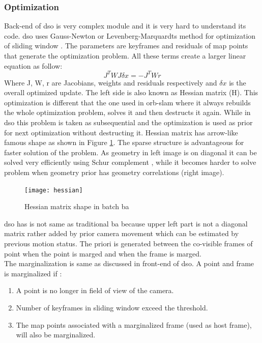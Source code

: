 \subsubsection{Optimization}
Back-end of \acrshort{dso} is very complex module and it is very hard to understand its code. \acrshort{dso} uses Gauss-Newton or Levenberg-Marquardts method for optimization of sliding window \cite{Engel-et-al-pami2018}. The parameters are keyframes and residuals of map points that generate the optimization problem. All these terms create a larger linear equation as follow: 
\begin{equation*}
J^{T}WJ\delta x= -J^{T}Wr
\end{equation*} 
Where J, W, r are Jacobians, weights and residuals respectively and $ \delta x $ is the overall optimized update. The left side is also known as Hessian matrix (H). This optimization is different that the one used in \acrshort{orb}-\acrshort{slam} where it always rebuilds the whole optimization problem, solves it and then destructs it again. While in \acrshort{dso} this problem is taken as subsequential and the optimization is used as prior for next optimization without destructing it. Hessian matrix has arrow-like famous shape as shown in Figure \ref{fig:hessiain}. The sparse structure is advantageous for faster solution of the problem. As geometry in left image is on diagonal it can be solved very efficiently using Schur complement \cite{Engel-et-al-pami2018}, while it becomes harder to solve problem when geometry prior has geometry correlations (right image).   
\begin{figure}[h!]
	\centering
	\texttt{[image: hessian]}
	\caption{Hessian matrix shape in batch \acrshort{ba} \cite{Engel-et-al-pami2018}}
	\label{fig:hessiain}
\end{figure}
\acrshort{dso} has is not same as traditional \acrshort{ba} because upper left part is not a diagonal matrix rather added by prior camera movement which can be estimated by previous motion status. The priori is generated between the co-visible frames of point when the point is marged and when the frame is marged. \\
\newline
The marginalization is same as discussed in front-end of \acrshort{dso}. A point and frame is marginalized if :
\begin{enumerate}
	\item A point is no longer in field of view of the camera.
	\item Number of keyframes in sliding window exceed the threshold.  
	\item The map points associated with a marginalized frame (used as host frame), will also be marginalized.
\end{enumerate}

